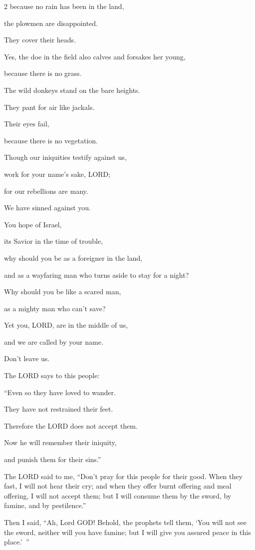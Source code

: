\begin{multicols}{2}
because no rain has been in the land,

the plowmen are disappointed.

They cover their heads.


\myverse{}Yes, the doe in the field also calves and forsakes her young,

because there is no grass.


\myverse{}The wild donkeys stand on the bare heights.

They pant for air like jackals.

Their eyes fail,

because there is no vegetation.


\myverse{}Though our iniquities testify against us,

work for your name’s sake, LORD;

for our rebellions are many.

We have sinned against you.


\myverse{}You hope of Israel,

its Savior in the time of trouble,

why should you be as a foreigner in the land,

and as a wayfaring man who turns aside to stay for a night?


\myverse{}Why should you be like a scared man,

as a mighty man who can’t save?

Yet you, LORD, are in the middle of us,

and we are called by your name.

Don’t leave us.


\myverse{}The LORD says to this people:

“Even so they have loved to wander.

They have not restrained their feet.

Therefore the LORD does not accept them.

Now he will remember their iniquity,

and punish them for their sins.”
\end{multicols}


\myverse{}The LORD said to me, “Don’t pray for this people for their good. \myverse{}When they fast, I will not hear their cry; and when they offer burnt offering and meal offering, I will not accept them; but I will consume them by the sword, by famine, and by pestilence.”


\myverse{}Then I said, “Ah, Lord GOD! Behold, the prophets tell them, ‘You will not see the sword, neither will you have famine; but I will give you assured peace in this place.’ ”


